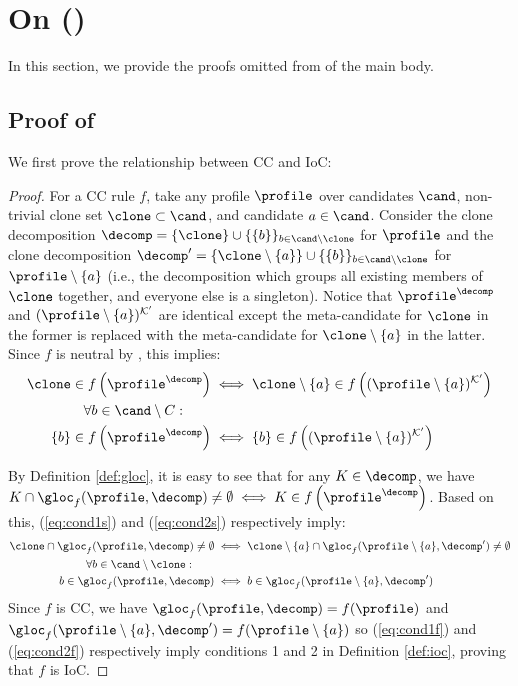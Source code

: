\section{On  ()}

In this section, we provide the proofs omitted from  of the main body.
\subsection{Proof of }

We first prove the relationship between CC and IoC:
\cctoioc*
\begin{proof}
For a CC rule $f$, take any profile $\profile$ over candidates $\cand$, non-trivial clone set $\clone \subset \cand$, and candidate $a\in \cand$.
Consider the clone decomposition $\decomp = \{\clone\} \cup \{\{b\}\}_{b\in \cand \setminus \clone}$ for $\profile$ and the clone decomposition $\decomp' = \{ \clone\setminus \{a\} \} \cup \{\{b\}\}_{b\in \cand \setminus \clone}$ for $\profile \setminus \{a\}$ (i.e., the decomposition which groups all existing members of $\clone$ together, and everyone else is a singleton). Notice that $\profile^\decomp$ and  $(\profile\setminus\{a\})^\mathcal{K'}$ are identical except the meta-candidate for $\clone$ in the former is replaced with the meta-candidate for $\clone \setminus \{a\}$ in the latter. Since $f$ is neutral by , this implies:
\begin{align}
    \clone \in f\left(\profile^\decomp\right) &\iff  \clone \setminus\{a\} \in f\left((\profile\setminus\{a\})^\mathcal{K'}\right) \label{eq:cond1s}\\
    \forall b \in \cand \setminus C: \quad \quad& \nonumber \\\{b\} \in f\left(\profile^\decomp\right) &\iff  \{b\} \in f\left((\profile\setminus\{a\})^\mathcal{K'}\right) \label{eq:cond2s}
\end{align}
    
    By Definition \ref{def:gloc}, it is easy to see that for any $K \in \decomp$, we have $K \cap \gloc_f(\profile, \decomp) \neq \emptyset \iff K \in f\left(\profile^\decomp\right)$. Based on this, (\ref{eq:cond1s}) and  (\ref{eq:cond2s}) respectively imply:
    \begin{align}
    \clone \cap \gloc_f(\profile, \decomp) \neq \emptyset &\iff  \clone \setminus\{a\}\cap \gloc_f(\profile \setminus \{a\}, \decomp') \neq \emptyset\label{eq:cond1f}\\
  \forall b \in \cand \setminus \clone:\quad \quad& \nonumber \\  b \in \gloc_f(\profile, \decomp) &\iff  b \in \gloc_f(\profile \setminus \{a\}, \decomp')\label{eq:cond2f}
\end{align}
Since $f$ is CC, we have $\gloc_f(\profile, \decomp) = f(\profile)$ and $\gloc_f(\profile\setminus\{a\}, \decomp') = f(\profile\setminus\{a\})$ so (\ref{eq:cond1f}) and (\ref{eq:cond2f}) respectively imply conditions 1 and 2 in Definition \ref{def:ioc}, proving that $f$ is IoC.
\end{proof}



